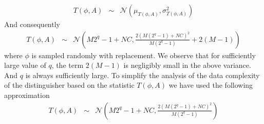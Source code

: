 \begin{eqnarray*}
T\left(\phi,A\right) &\sim & \mathcal{N}(\mu_{T\left(\phi,A\right)},\sigma_{T\left(\phi,A\right)}^{2})
\end{eqnarray*}
And consequently
\begin{eqnarray*}
T\left(\phi,A\right) &\sim & \mathcal{N}\left(M2^q-1 + NC,\frac{2(M(2^q-1)+ NC)^2}{M(2^q-1)}+2(M-1)\right) 
\end{eqnarray*}
where $\phi$ is sampled randomly with replacement. We observe that for sufficiently large value of $q$, the term $2(M-1)$ is negligibly small in the above variance. And $q$ is always sufficiently large. To simplify the analysis of the data complexity of the distinguisher based on the statistic $T(\phi,A)$ we have used the following approximation
\begin{eqnarray}
T\left(\phi,A\right) &\sim & \mathcal{N}\left(M2^q-1 + NC,\frac{2(M(2^q-1)+ NC)^2}{M(2^q-1)}\right) \label{eqn:T_a_variable_set_of_fixations}
\end{eqnarray}

\iffalse
